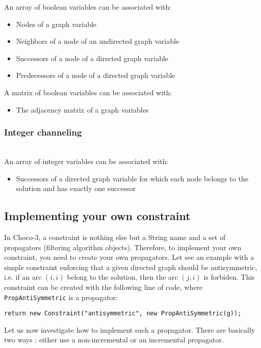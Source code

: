 \documentclass{article}
\begin{document}
An array of boolean variables can be associated with: 
\begin{itemize}
\item Nodes of a graph variable
\item Neighbors of a node of an undirected graph variable
\item Successors of a node of a directed graph variable
\item Predecessors of a node of a directed graph variable
\end{itemize}

A matrix of boolean variables can be associated with: 
\begin{itemize}
\item The adjacency matrix of a graph variables
\end{itemize}

\subsubsection{Integer channeling}~\\

An array of integer variables can be associated with: 
\begin{itemize}
\item Successors of a directed graph variable for which each node belongs to the solution and has exactly one successor
\end{itemize}


\subsection{Implementing your own constraint}

In Choco-3, a constraint is nothing else but a String name and a set of propagators (filtering algorithm objects). Therefore, 
to implement your own constraint, you need to create your own propagators. Let see an example with a simple constraint enforcing that a given directed graph should be antisymmetric, i.e. if an arc $(i,i)$ belong to the solution, then the arc $(j,i)$ is forbiden. This constraint can be created with the following line of code, where \texttt{PropAntiSymmetric} is a propagator:
\begin{lstlisting}
return new Constraint("antisymmetric", new PropAntiSymmetric(g));
\end{lstlisting}

Let us now investigate how to implement such a propagator. There are basically two ways : either use a non-incremental or an incremental propagator. 
\end{document}
